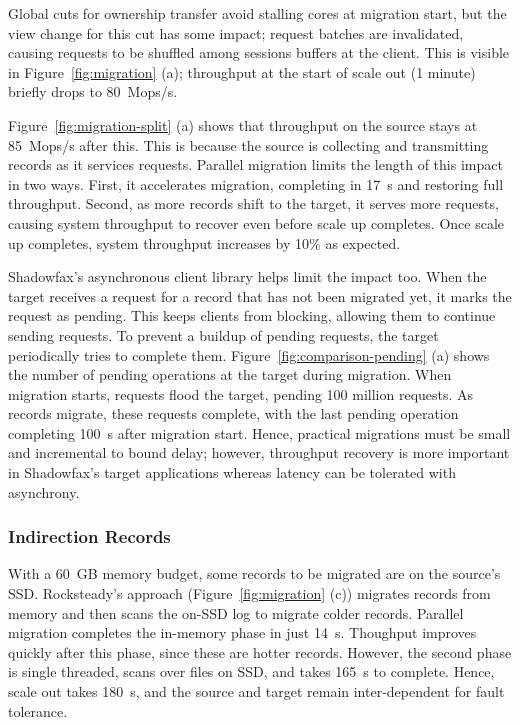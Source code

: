 Global cuts for ownership transfer avoid stalling cores at migration start, but
the view change for this cut has some impact; request batches are invalidated,
causing requests to be shuffled among sessions buffers at the client.
%
This is visible in Figure~\ref{fig:migration} (a); throughput at the
start of scale out (1 minute) briefly drops to 80~Mops/s.

Figure~\ref{fig:migration-split} (a) shows that throughput on the source
stays at 85~Mops/s after this.
%
This is because the source is collecting and transmitting records as it
services requests.
%
Parallel migration limits the length of this impact in two ways.
%
First, it accelerates migration, completing in 17~s and restoring full
throughput.
%
Second, as more records shift to the target, it
serves more requests, causing system throughput to recover
even before scale up completes.
%
Once scale up completes, system throughput increases by 10\% as expected.

Shadowfax's asynchronous client library helps limit the
impact too.
%
When the target receives a request for a record that has not been
migrated yet, it marks the request as pending.
%
This keeps clients from blocking, allowing them to
continue sending requests.
%
To prevent a buildup of pending requests, the target periodically tries to complete them.
%
Figure~\ref{fig:comparison-pending} (a) shows the number of pending operations at the
target during migration.
%
When migration starts, requests flood the target, pending 100 million requests.
%
As records migrate, these requests complete, with the last pending operation
completing 100~s after migration start.
%
Hence, practical migrations must be small and incremental to bound
delay; however, throughput recovery is more important in Shadowfax's target
applications whereas latency can be tolerated with asynchrony.

\subsubsection{Indirection Records}
\label{sec:eval:migration:indir}

With a 60~GB memory budget, some records to be migrated are on the source's
SSD.
%
Rocksteady's approach (Figure~\ref{fig:migration} (c)) migrates records from
memory and then scans the on-SSD log to migrate colder records.
%
Parallel migration completes the in-memory phase in just 14~s.
%
Thoughput improves quickly after this phase, since these are hotter records.
%
However, the second phase is single threaded, scans over files on SSD,
and takes 165~s to complete.
%
Hence, scale out takes 180~s, and the source and target remain inter-dependent
for fault tolerance.

